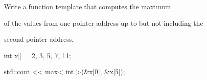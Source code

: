 Write a function template that computes the maximum

of the values from one pointer address up to but not including the

second pointer address.



\begin{consolethree}[escapeinside=||]

int x[] = {2, 3, 5, 7, 11};

std::cout << max< int >(&x[0], &x[5]);

\end{consolethree}

